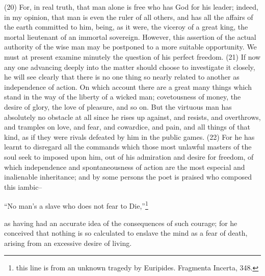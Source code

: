(20) For, in real truth, that man alone is free who has God for his leader; indeed, in my opinion, that
man is even the ruler of all others, and has all the affairs of the earth committed to him, being, as it
were, the viceroy of a great king, the mortal lieutenant of an immortal sovereign. However, this
assertion of the actual authority of the wise man may be postponed to a more suitable opportunity.
We must at present examine minutely the question of his perfect freedom. (21) If now any one
advancing deeply into the matter should choose to investigate it closely, he will see clearly that
there is no one thing so nearly related to another as independence of action. On which account
there are a great many things which stand in the way of the liberty of a wicked man; covetousness
of money, the desire of glory, the love of pleasure, and so on. But the virtuous man has absolutely
no obstacle at all since he rises up against, and resists, and overthrows, and tramples on love, and
fear, and cowardice, and pain, and all things of that kind, as if they were rivals defeated by him in
the public games. (22) For he has learnt to disregard all the commands which those most unlawful
masters of the soul seek to imposed upon him, out of his admiration and desire for freedom, of
which independence and spontaneousness of action are the most especial and inalienable
inheritance; and by some persons the poet is praised who composed this iambic--

``No man's a slave who does not fear to Die,''\footnote{this line is from an unknown tragedy by Euripides. Fragmenta
Incerta, 348.}

as having had an accurate idea of the consequences of such courage; for he conceived that
nothing is so calculated to enslave the mind as a fear of death, arising from an excessive desire of
living.

